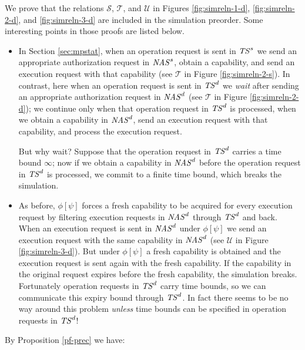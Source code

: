 \documentclass[10pt]{article}
\begin{document}
We prove that the relations $\mathcal S$, $\mathcal T$, and $\mathcal U$ in Figures \ref{fig:simreln-1-d}, \ref{fig:simreln-2-d}, and \ref{fig:simreln-3-d} are included in the simulation preorder. Some interesting points in those proofs are listed below. 
\begin{itemize}
\item In Section \ref{sec:mpstat}, when an operation request is sent in ${\it TS}^s$ we send an appropriate authorization request in ${\it NAS}^s$, obtain a capability, and send an execution request with that capability (see $\mathcal T$ in Figure \ref{fig:simreln-2-s}). In contrast, here when an operation request is sent in ${\it TS}^d$ we \emph{wait} after sending an appropriate authorization request in ${\it NAS}^d$ (see $\mathcal T$ in Figure \ref{fig:simreln-2-d}); we continue only when that operation request in ${\it TS}^d$ is processed, when we obtain a capability in ${\it NAS}^d$, send an execution request with that capability, and process the execution request. 

But why wait? Suppose that the operation request in ${\it TS}^d$ carries a time bound $\infty$; now if we obtain a capability in ${\it NAS}^d$ before the operation request in ${\it TS}^d$ is processed, we commit to a finite time bound, which breaks the simulation. 
\item As before, $\phi[\psi]$ forces a fresh capability to be acquired for every execution request by filtering execution requests in ${\it NAS}^d$ through ${\it TS}^d$ and back. When an execution request is sent in ${\it NAS}^d$ under $\phi[\psi]$ we  send an execution request with the same capability in ${\it NAS}^d$ (see $\mathcal U$ in Figure \ref{fig:simreln-3-d}). But under $\phi[\psi]$ a fresh capability is obtained and the execution request is sent again with the fresh capability. If the capability in the original request expires before the fresh capability, the simulation breaks. Fortunately operation requests in ${\it TS}^d$ carry time bounds, so we can communicate this expiry bound through ${\it TS}^d$. In fact there seems to be no way around this problem \emph{unless} time bounds can be specified in operation requests in ${\it TS}^d$!
\end{itemize}
By Proposition \ref{pf-prec} we have:
\end{document}
